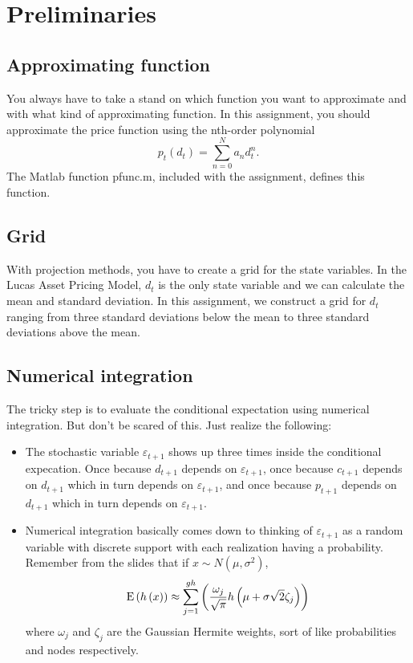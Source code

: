 \documentclass{article}
\begin{document}
\section{Preliminaries}

\subsection{Approximating function}

You always have to take a stand on which function you want to approximate
and with what kind of approximating function. In this assignment, you should
approximate the price function using the nth-order polynomial%
\begin{equation*}
p_{t}\left( d_{t}\right) =\sum_{n=0}^{N}a_{n}d_{t}^{n}\text{.}
\end{equation*}%
The Matlab function pfunc.m, included with the assignment, defines this
function.

\subsection{Grid}

With projection methods, you have to create a grid for the state variables.
In the Lucas Asset Pricing Model, $d_{t}$ is the only state variable and we
can calculate the mean and standard deviation. In this assignment, we
construct a grid for $d_{t}$ ranging from three standard deviations below
the mean to three standard deviations above the mean.

\subsection{Numerical integration}

The tricky step is to evaluate the conditional expectation using numerical
integration. But don't be scared of this. Just realize the following:

\begin{itemize}
\item The stochastic variable $\varepsilon _{t+1}$ shows up three times
inside the conditional expecation. Once because $d_{t+1}$ depends on $%
\varepsilon _{t+1}$, once because $c_{t+1}$ depends on $d_{t+1}$ which in
turn depends on $\varepsilon _{t+1}$, and once because $p_{t+1}$ depends on $%
d_{t+1}$ which in turn depends on $\varepsilon _{t+1}$.

\item Numerical integration basically comes down to thinking of $\varepsilon
_{t+1}$ as a random variable with discrete support with each realization
having a probability. Remember from the slides that if $x\sim N\left( \mu
,\sigma ^{2}\right) $,%
\begin{equation*}
\text{E}\left( h\left( x\right) \right) \approx \sum_{j=1}^{gh}\left( \frac{%
\omega _{j}}{\sqrt{\pi }}h\left( \mu +\sigma \sqrt{2}\zeta _{j}\right)
\right) 
\end{equation*}%
where $\omega _{j}$ and $\zeta _{j}$ are the Gaussian Hermite weights, sort
of like probabilities and nodes respectively.
\end{itemize}
\end{document}
